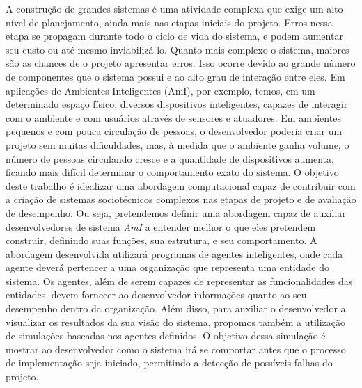 
A construção de grandes sistemas é uma atividade complexa que exige um alto nível de planejamento, ainda mais nas etapas iniciais do projeto. Erros nessa etapa se propagam durante todo o ciclo de vida do sistema, e podem aumentar seu custo ou até mesmo inviabilizá-lo. Quanto mais complexo o sistema, maiores são as chances de o projeto apresentar erros. Isso ocorre devido ao grande número de componentes que o sistema possui e ao alto grau de interação entre eles. 
Em aplicações de Ambientes Inteligentes (AmI), por exemplo, temos, em um determinado espaço físico, diversos dispositivos inteligentes, capazes de interagir com o ambiente e com usuários através de sensores e atuadores. Em ambientes pequenos e com pouca circulação de pessoas, o desenvolvedor poderia criar um projeto sem muitas dificuldades, mas, à medida que o ambiente ganha volume, o número de pessoas circulando cresce e a quantidade de dispositivos aumenta, ficando mais difícil determinar o comportamento exato do sistema. 
O objetivo deste trabalho é idealizar uma abordagem computacional capaz de contribuir com a criação de sistemas sociotécnicos complexos nas etapas de projeto e de avaliação de desempenho. Ou seja, pretendemos definir uma abordagem capaz de auxiliar desenvolvedores de sistema \textit{AmI} a entender melhor o que eles pretendem construir, definindo suas funções, sua estrutura, e seu comportamento. 
A abordagem desenvolvida utilizará programas de agentes inteligentes, onde cada agente deverá pertencer a uma organização que representa uma entidade do sistema. Os agentes, além de serem capazes de representar as funcionalidades das entidades, devem fornecer ao desenvolvedor informações quanto ao seu desempenho dentro da organização. Além disso, para auxiliar o desenvolvedor a visualizar os resultados da sua visão do sistema, propomos também a utilização de simulações baseadas nos agentes definidos. O objetivo dessa simulação é mostrar ao desenvolvedor como o sistema irá se comportar antes que o processo de implementação seja iniciado, permitindo a detecção de possíveis falhas do projeto.

